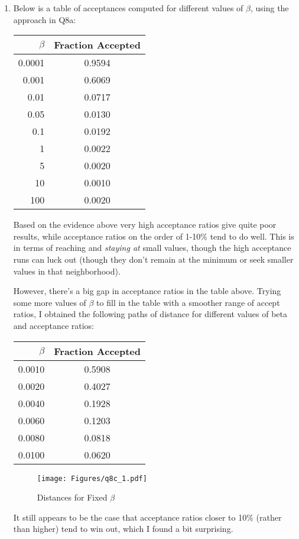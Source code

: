 \documentclass[12pt]{article}
\theoremstyle{plain}
\theoremstyle{definition}
\theoremstyle{remark}
\begin{document}
\begin{enumerate}
\begin{enumerate}
    \item %
      Below is a table of acceptances computed for different values of
      $\beta$, using the approach in Q8a:
      \begin{table}[htpb!]
        \centering
        \begin{tabular}{r|c}
          $\beta$ & Fraction Accepted \\\hline\hline
          0.0001&    0.9594\\
          0.001&    0.6069\\
          0.01&    0.0717\\
          0.05&    0.0130\\
          0.1&    0.0192\\
          1&    0.0022\\
          5&    0.0020\\
          10&    0.0010\\
          100&    0.0020\\
        \end{tabular}
      \end{table}
      Based on the evidence above very high acceptance ratios give quite
      poor results, while acceptance ratios on the order of 1-10\% tend
      to do well. This is in terms of reaching and \emph{staying at}
      small values, though the high acceptance runs can luck out (though
      they don't remain at the minimum or seek smaller values in that
      neighborhood).

      However, there's a big gap in acceptance ratios in the table above.
      Trying some more values of $\beta$ to fill in the table with a
      smoother range of accept ratios, I obtained the following paths of
      distance for different values of beta and acceptance ratios:
      \begin{table}[htpb!]
        \centering
        \begin{tabular}{r|c}
          $\beta$ & Fraction Accepted \\\hline\hline
          0.0010&    0.5908\\
          0.0020&    0.4027\\
          0.0040&    0.1928\\
          0.0060&    0.1203\\
          0.0080&    0.0818\\
          0.0100&    0.0620\\
        \end{tabular}
      \end{table}
      \begin{figure}[htpb!]
        \centering
        \caption{Distances for Fixed $\beta$}
        \label{fig:q8c.1}
        \texttt{[image: Figures/q8c\_1.pdf]}
      \end{figure}
      It still appears to be the case that acceptance ratios closer to
      10\% (rather than higher) tend to win out, which I found a bit
      surprising.


    \end{enumerate}

\end{enumerate}
\end{document}
